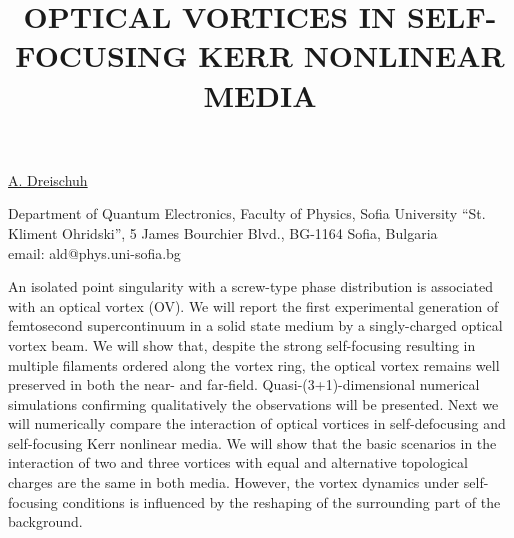 \title{OPTICAL VORTICES IN SELF-FOCUSING KERR NONLINEAR MEDIA}

\underline{A. Dreischuh}


Department of Quantum Electronics,
Faculty of Physics,
Sofia University ``St. Kliment Ohridski'',
5 James Bourchier Blvd.,
BG-1164 Sofia, Bulgaria\\
email: ald@phys.uni-sofia.bg

An isolated point singularity with a screw-type phase distribution is associated with an optical vortex (OV). We will report the first experimental generation of femtosecond supercontinuum in a solid state medium by a singly-charged optical vortex beam. We will show that, despite the strong self-focusing resulting in multiple filaments ordered along the vortex ring, the optical vortex remains well preserved in both the near- and far-field. Quasi-(3+1)-dimensional numerical simulations confirming qualitatively the observations will be presented. Next we will numerically compare the interaction of optical vortices in self-defocusing and self-focusing Kerr nonlinear media. We will show that the basic scenarios in the interaction of two and three vortices with equal and alternative topological charges are the same in both media. However, the vortex dynamics under self-focusing conditions is influenced by the reshaping of the surrounding part of the background.

\vspace{\baselineskip}